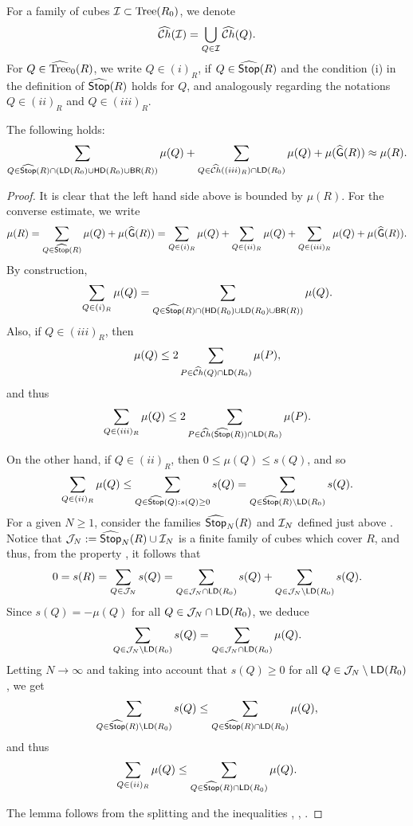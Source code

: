 \vv

For a family of cubes ${\mathcal I}\subset {\rm Tree}(R_0)$, we denote 
$${\widehat{{\mathcal Ch}}}({\mathcal I})=\bigcup_{Q\in {\mathcal I}} {\widehat{{\mathcal Ch}}}(Q).$$
For $Q\in{\widehat{{\rm Tree}}}_0(R)$, we write $Q\in (i)_R$, if $Q\in{\widehat{{\mathsf {Stop}}}}(R)$ and the condition (i) in the definition of 
${\widehat{{\mathsf {Stop}}}}(R)$ holds for $Q$, and analogously regarding the notations $Q\in (ii)_R$ and $Q\in (iii)_R$.


\begin{lemma}\label{lem9.5*}
The following holds:
$$\sum_{Q\in{\widehat{{\mathsf {Stop}}}}(R)\cap({\mathsf{LD}}(R_0)\cup{\mathsf{HD}}(R_0)\cup{\mathsf {BR}}(R))}\mu(Q) 
+\sum_{Q\in{\widehat{{\mathcal Ch}}}((iii)_R)\cap {\mathsf{LD}}(R_0)}\mu(Q) + \mu({\widehat{{\mathsf{G}}}}(R))
\approx \mu(R).$$
\end{lemma}

\begin{proof}
It is clear that the left hand side above is bounded by $\mu(R)$.
For the converse estimate,  we write
\begin{equation}\label{eqsplit63}
\mu(R) = \sum_{Q\in{\widehat{{\mathsf {Stop}}}}(R)}\mu(Q) + \mu({\widehat{{\mathsf{G}}}}(R)) = 
\sum_{Q\in (i)_R} \mu(Q) + \sum_{Q\in (ii)_R} \mu(Q) +\sum_{Q\in (iii)_R} \mu(Q)  
 + \mu({\widehat{{\mathsf{G}}}}(R)).
 \end{equation}
 By construction,
\begin{equation}\label{eqsplit64}
\sum_{Q\in (i)_R} \mu(Q) =\sum_{Q\in {\widehat{{\mathsf {Stop}}}}(R)\cap(
{\mathsf{HD}}(R_0)\cup{\mathsf{LD}}(R_0)\cup{\mathsf {BR}}(R))}\mu(Q).
\end{equation}
Also, if $Q\in (iii)_R$, then
$$\mu(Q)\leq 2\sum_{P\in{\widehat{{\mathcal Ch}}}(Q)\cap {\mathsf{LD}}(R_0)}\mu(P),$$
and thus
\begin{equation}\label{eqsplit65}
\sum_{Q\in (iii)_R} \mu(Q)\leq 2 \sum_{P\in{\widehat{{\mathcal Ch}}}({\widehat{{\mathsf {Stop}}}}(R))\cap {\mathsf{LD}}(R_0)}\mu(P).
\end{equation}

On the other hand, if $Q\in (ii)_R$, then $0\leq \mu(Q)\leq s(Q)$, and so
$$\sum_{Q\in (ii)_R} \mu(Q)\leq \sum_{Q\in {\widehat{{\mathsf {Stop}}}}(Q):s(Q)\geq 0} s(Q) = \sum_{Q\in {\widehat{{\mathsf {Stop}}}}(R)\setminus {\mathsf{LD}}(R_0)} s(Q).$$
For a given $N\geq 1$, consider the families ${\widehat{{\mathsf {Stop}}}}_N(R)$ and ${\mathcal I}_N$ defined just above .
Notice that ${\mathcal J}_N:= {\widehat{{\mathsf {Stop}}}}_N(R)\cup{\mathcal I}_N$ is a finite family of cubes which cover $R$, and thus, 
from the property ,
it follows that
$$0 = s(R) = \sum_{Q\in {\mathcal J}_N}s(Q) = \sum_{Q\in {\mathcal J}_N\cap {\mathsf{LD}}(R_0)} s(Q) + 
\sum_{Q\in {\mathcal J}_N\setminus {\mathsf{LD}}(R_0)} s(Q). $$
Since $s(Q) = -\mu(Q)$ for all $Q\in {\mathcal J}_N\cap {\mathsf{LD}}(R_0)$, we deduce
$$\sum_{Q\in {\mathcal J}_N\setminus {\mathsf{LD}}(R_0)} s(Q) = \sum_{Q\in {\mathcal J}_N\cap {\mathsf{LD}}(R_0)} \mu(Q).$$ 
Letting $N\to\infty$ and taking into account that $s(Q)\geq 0$ for all
$Q\in {\mathcal J}_N\setminus {\mathsf{LD}}(R_0)$, we get
$$\sum_{Q\in {\widehat{{\mathsf {Stop}}}}(R)\setminus {\mathsf{LD}}(R_0)} s(Q)\leq \sum_{Q\in {\widehat{{\mathsf {Stop}}}}(R)\cap {\mathsf{LD}}(R_0)} \mu(Q),$$
and thus
\begin{equation}\label{eqsplit66}
\sum_{Q\in (ii)_R} \mu(Q)\leq \sum_{Q\in {\widehat{{\mathsf {Stop}}}}(R)\cap {\mathsf{LD}}(R_0)} \mu(Q).
\end{equation}

The lemma follows from the splitting  and the inequalities , , .
\end{proof}


